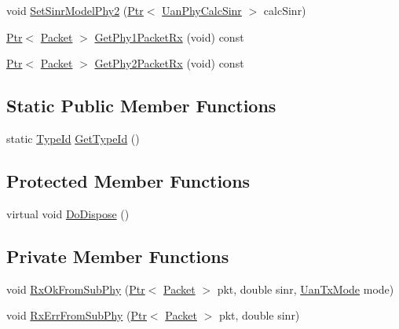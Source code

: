 \begin{DoxyCompactItemize}
\item 
void \hyperlink{classns3_1_1UanPhyDual_a7ace7148b8546c5981920280df52237e}{Set\+Sinr\+Model\+Phy2} (\hyperlink{classns3_1_1Ptr}{Ptr}$<$ \hyperlink{classns3_1_1UanPhyCalcSinr}{Uan\+Phy\+Calc\+Sinr} $>$ calc\+Sinr)
\item 
\hyperlink{classns3_1_1Ptr}{Ptr}$<$ \hyperlink{classns3_1_1Packet}{Packet} $>$ \hyperlink{classns3_1_1UanPhyDual_afa4807f194b683ed9a4e514f9fbcc7e0}{Get\+Phy1\+Packet\+Rx} (void) const 
\item 
\hyperlink{classns3_1_1Ptr}{Ptr}$<$ \hyperlink{classns3_1_1Packet}{Packet} $>$ \hyperlink{classns3_1_1UanPhyDual_a0606d84f01a79913c79510f680d10827}{Get\+Phy2\+Packet\+Rx} (void) const 
\end{DoxyCompactItemize}
\subsection*{Static Public Member Functions}
\begin{DoxyCompactItemize}
\item 
static \hyperlink{classns3_1_1TypeId}{Type\+Id} \hyperlink{classns3_1_1UanPhyDual_a752fb11320bd10e9ae1d92561eb02bac}{Get\+Type\+Id} ()
\end{DoxyCompactItemize}
\subsection*{Protected Member Functions}
\begin{DoxyCompactItemize}
\item 
virtual void \hyperlink{classns3_1_1UanPhyDual_a00772c9333da62fe7a92e56e403a9354}{Do\+Dispose} ()
\end{DoxyCompactItemize}
\subsection*{Private Member Functions}
\begin{DoxyCompactItemize}
\item 
void \hyperlink{classns3_1_1UanPhyDual_a095f6eee477bf838de193cb3ea6487c7}{Rx\+Ok\+From\+Sub\+Phy} (\hyperlink{classns3_1_1Ptr}{Ptr}$<$ \hyperlink{classns3_1_1Packet}{Packet} $>$ pkt, double sinr, \hyperlink{classns3_1_1UanTxMode}{Uan\+Tx\+Mode} mode)
\item 
void \hyperlink{classns3_1_1UanPhyDual_abb491f554bf32fbb219b1251ff3d1f79}{Rx\+Err\+From\+Sub\+Phy} (\hyperlink{classns3_1_1Ptr}{Ptr}$<$ \hyperlink{classns3_1_1Packet}{Packet} $>$ pkt, double sinr)
\end{DoxyCompactItemize}

